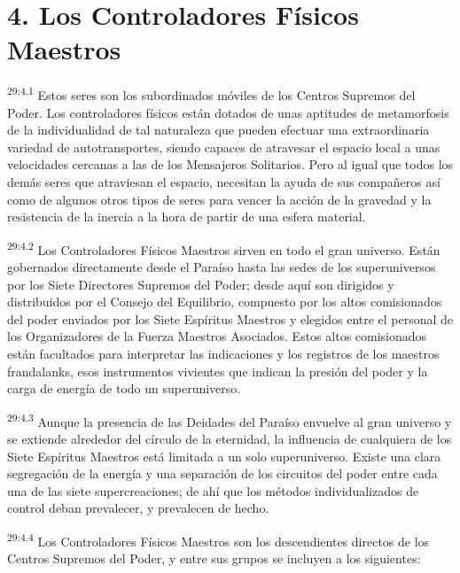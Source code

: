 \section*{4. Los Controladores Físicos Maestros}
\par
\textsuperscript{29:4.1} Estos seres son los subordinados móviles de los Centros Supremos del Poder. Los controladores físicos están dotados de unas aptitudes de metamorfosis de la individualidad de tal naturaleza que pueden efectuar una extraordinaria variedad de autotransportes, siendo capaces de atravesar el espacio local a unas velocidades cercanas a las de los Mensajeros Solitarios. Pero al igual que todos los demás seres que atraviesan el espacio, necesitan la ayuda de sus compañeros así como de algunos otros tipos de seres para vencer la acción de la gravedad y la resistencia de la inercia a la hora de partir de una esfera material.

\par
\textsuperscript{29:4.2} Los Controladores Físicos Maestros sirven en todo el gran universo. Están gobernados directamente desde el Paraíso hasta las sedes de los superuniversos por los Siete Directores Supremos del Poder; desde aquí son dirigidos y distribuidos por el Consejo del Equilibrio, compuesto por los altos comisionados del poder enviados por los Siete Espíritus Maestros y elegidos entre el personal de los Organizadores de la Fuerza Maestros Asociados. Estos altos comisionados están facultados para interpretar las indicaciones y los registros de los maestros frandalanks, esos instrumentos vivientes que indican la presión del poder y la carga de energía de todo un superuniverso.

\par
\textsuperscript{29:4.3} Aunque la presencia de las Deidades del Paraíso envuelve al gran universo y se extiende alrededor del círculo de la eternidad, la influencia de cualquiera de los Siete Espíritus Maestros está limitada a un solo superuniverso. Existe una clara segregación de la energía y una separación de los circuitos del poder entre cada una de las siete supercreaciones; de ahí que los métodos individualizados de control deban prevalecer, y prevalecen de hecho.

\par
\textsuperscript{29:4.4} Los Controladores Físicos Maestros son los descendientes directos de los Centros Supremos del Poder, y entre sus grupos se incluyen a los siguientes:

